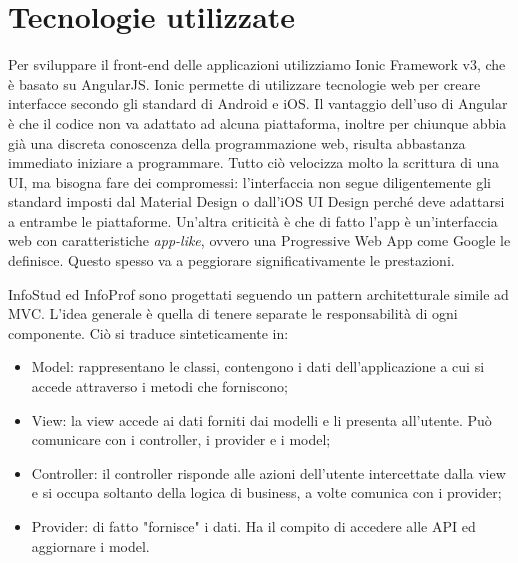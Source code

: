 \documentclass[Lau, oneside, noexaminfo]{sapthesis}%
\begin{document}
\section{Tecnologie utilizzate}
\label{sec:tech}
Per sviluppare il front-end delle applicazioni utilizziamo Ionic Framework v3, che è basato su AngularJS. Ionic permette di utilizzare tecnologie web per creare interfacce secondo gli standard di Android e iOS. Il vantaggio dell'uso di Angular è che il codice non va adattato ad alcuna piattaforma, inoltre per chiunque abbia già una discreta conoscenza della programmazione web, risulta abbastanza immediato iniziare a programmare. Tutto ciò velocizza molto la scrittura di una UI, ma bisogna fare dei compromessi: l'interfaccia non segue diligentemente gli standard imposti dal Material Design o dall'iOS UI Design perché deve adattarsi a entrambe le piattaforme. Un'altra criticità è che di fatto l'app è un'interfaccia web con caratteristiche \textit{app-like}, ovvero una Progressive Web App come Google le definisce. Questo spesso va a peggiorare significativamente le prestazioni. 

InfoStud ed InfoProf sono progettati seguendo un pattern architetturale simile ad MVC. L'idea generale è quella di tenere separate le responsabilità di ogni componente. Ciò si traduce sinteticamente in:

\begin{itemize}
	\item Model: rappresentano le classi, contengono i dati dell'applicazione a cui si accede attraverso i metodi che forniscono;
	\item View: la view accede ai dati forniti dai modelli e li presenta all'utente. Può comunicare con i controller, i provider e i model;
	\item Controller: il controller risponde alle azioni dell'utente intercettate dalla view e si occupa soltanto della logica di business, a volte comunica con i provider;
	\item Provider: di fatto "fornisce" i dati. Ha il compito di accedere alle API ed aggiornare i model.
\end{itemize}
\end{document}

